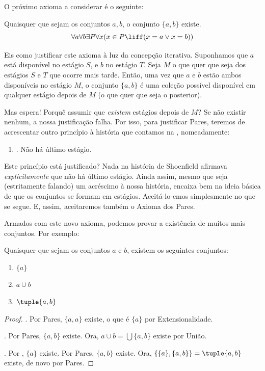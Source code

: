 \documentclass[../../../include/open-logic-section]{subfiles}
\begin{document}

O próximo axioma a considerar é o seguinte:

\begin{axiom}[Pares]
Quaisquer que sejam os conjuntos $a, b$, o conjunto $\{a, b\}$ existe.
\[
	\forall a \forall b \exists P \forall x (x \in P \liff (x = a \lor x = b))
\]
\end{axiom}

Eis como justificar este axioma à luz da concepção iterativa. Suponhamos que $a$ está disponível no estágio $S$, e $b$ no estágio $T$. Seja $M$ o que quer que seja dos estágios $S$ e $T$ que ocorre mais tarde. Então, uma vez que $a$ e $b$ estão ambos disponíveis no estágio $M$, o conjunto $\{a,b\}$ é uma coleção possível disponível em qualquer estágio depois de $M$ (o que quer que seja o posterior).

Mas espera!{} Porquê assumir que \emph{existem} estágios depois de $M$? Se não existir nenhum, a nossa justificação falha. Por isso, para justificar Pares, teremos de acrescentar outro princípio à história que contamos na , nomeadamente:
\begin{enumerate}
	\item[] \stagessucc. Não há último estágio.
\end{enumerate}
Este princípio está justificado? Nada na história de Shoenfield afirmava
\emph{explicitamente} que não há último estágio. Ainda assim, mesmo que seja
(estritamente falando) um acréscimo à nossa história, encaixa bem na
ideia básica de que os conjuntos se formam em estágios. Aceitá-lo-emos simplesmente no que se segue. E, assim, aceitaremos também o Axioma dos Pares.

Armados com este novo axioma, podemos provar a existência de muitos mais conjuntos. Por exemplo:

\begin{prop}
Quaisquer que sejam os conjuntos $a$ e $b$, existem os seguintes conjuntos:
	\begin{enumerate}
		\item{} $\{a\}$
		\item{} $a \cup b$
		\item{} $\tuple{a, b}$
	\end{enumerate}
\end{prop}

\begin{proof}
. Por Pares, $\{a, a\}$ existe, o que é $\{a\}$ por
Extensionalidade.

. Por Pares, $\{a, b\}$ existe. Ora, $a \cup b = \bigcup
\{a, b\}$ existe por União.

. Por , $\{a\}$ existe. Por Pares, $\{a,
b\}$ existe. Ora, $\{\{a\}, \{a, b\}\} = \tuple{a, b}$ existe, de novo por Pares.
\end{proof}
\end{document}

